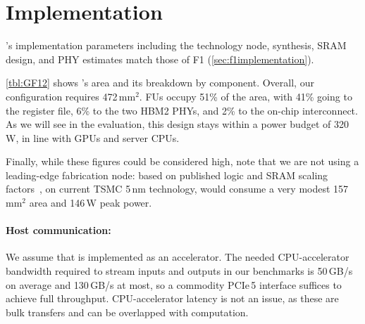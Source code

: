 \section{Implementation}\label{sec:implementation}

\tblGF

\name's implementation parameters including the technology node, synthesis,
SRAM design, and PHY estimates match those of F1
(\autoref{sec:f1implementation}).

\autoref{tbl:GF12} shows \name's area and its breakdown by component.
Overall, our \name configuration requires 472\,mm$^2$. %
FUs occupy 51\% of the area, with 41\% going to the register file,
6\% to the two HBM2 PHYs,
and 2\% to the on-chip interconnect.
As we will see in the evaluation, this design stays within a power budget of 320\,W,
in line with GPUs and server CPUs.

Finally, while these figures could be considered high,
note that we are not using a leading-edge fabrication node:
based on published logic and SRAM scaling factors~\cite{yeap:iedm19:tsmc-n5},
on current TSMC 5\,nm technology,
\name would consume a very modest
157\,mm$^\textrm{2}$ area and 146\,W peak power.

\paragraph{Host communication:}
We assume that \name is implemented as an accelerator.
The needed CPU-accelerator bandwidth required to stream inputs and outputs
in our benchmarks is 50\,GB/s on average and 130\,GB/s at most,
so a commodity PCIe\,5 interface suffices to achieve full throughput.
CPU-accelerator latency is not an issue, as these are bulk transfers
and can be overlapped with computation.

